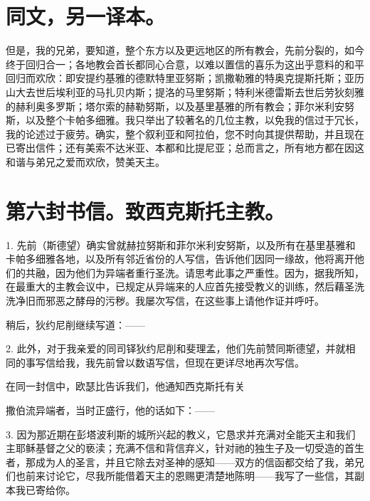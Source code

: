 
\section{同文，另一译本。}

但是，我的兄弟，要知道，整个东方以及更远地区的所有教会，先前分裂的，如今终于回归合一；各地教会首长都同心合意，以难以置信的喜乐为这出乎意料的和平回归而欢欣：即安提约基雅的德默特里亚努斯；凯撒勒雅的特奥克提斯托斯；亚历山大去世后埃利亚的马扎贝内斯；提洛的马里努斯；特利米德雷斯去世后劳狄刻雅的赫利奥多罗斯；塔尔索的赫勒努斯，以及基里基雅的所有教会；菲尔米利安努斯，以及整个卡帕多细雅。我只举出了较著名的几位主教，以免我的信过于冗长，我的论述过于疲劳。确实，整个叙利亚和阿拉伯，您不时向其提供帮助，并且现在已寄出信件；还有美索不达米亚、本都和比提尼亚；总而言之，所有地方都在因这和谐与弟兄之爱而欢欣，赞美天主。\par


\section{第六封书信。致西克斯托主教。}

1. 先前（斯德望）确实曾就赫拉努斯和菲尔米利安努斯，以及所有在基里基雅和卡帕多细雅各地，以及所有邻近省份的人写信，告诉他们因同一缘故，他将离开他们的共融，因为他们为异端者重行圣洗。请思考此事之严重性。因为，据我所知，在最重大的主教会议中，已规定从异端来的人应首先接受教义的训练，然后藉圣洗洗净旧而邪恶之酵母的污秽。我屡次写信，在这些事上请他作证并呼吁。\par

稍后，狄约尼削继续写道：——\par

2. 此外，对于我亲爱的同司铎狄约尼削和斐理孟，他们先前赞同斯德望，并就相同的事写信给我，我先前曾以数语写信，但现在更详尽地再次写信。\par

在同一封信中，欧瑟比告诉我们，他通知西克斯托有关\par

撒伯流异端者，当时正盛行，他的话如下：——\par

3. 因为那近期在彭塔波利斯的城所兴起的教义，它恳求并充满对全能天主和我们主耶稣基督之父的亵渎；充满不信和背信弃义，针对祂的独生子及一切受造的首生者，那成为人的圣言，并且它除去对圣神的感知——双方的信函都交给了我，弟兄们也前来讨论它，尽我所能借着天主的恩赐更清楚地陈明——我写了一些信，其副本我已寄给你。\par

